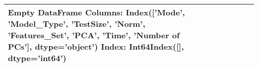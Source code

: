 \begin{tabular}{lllrllrrr}
\toprule
Empty DataFrame
Columns: Index(['Mode', 'Model\_Type', 'TestSize', 'Norm', 'Features\_Set', 'PCA', 'Time',
       'Number of PCs'],
      dtype='object')
Index: Int64Index([], dtype='int64') \\
\bottomrule
\end{tabular}
